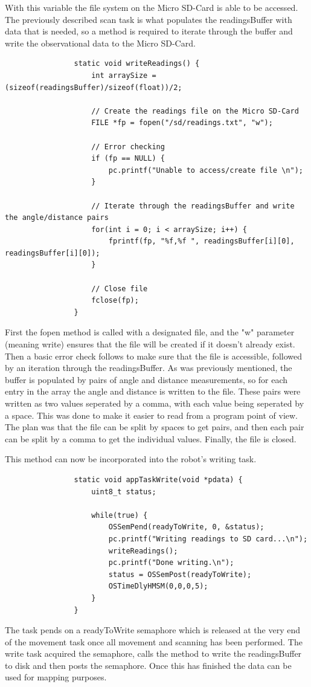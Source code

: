 				With this variable the file system on the Micro SD-Card is able to be accessed. The previously described scan task is what populates the readingsBuffer with data that is needed, so a method is required to iterate through the buffer and write the observational data to the Micro SD-Card.
				
				\begin{lstlisting}
				static void writeReadings() {
					int arraySize = (sizeof(readingsBuffer)/sizeof(float))/2;
				
					// Create the readings file on the Micro SD-Card
					FILE *fp = fopen("/sd/readings.txt", "w");
				
					// Error checking
					if (fp == NULL) {
						pc.printf("Unable to access/create file \n");
					}
				
					// Iterate through the readingsBuffer and write the angle/distance pairs
					for(int i = 0; i < arraySize; i++) {
						fprintf(fp, "%f,%f ", readingsBuffer[i][0], readingsBuffer[i][0]);
					}
				
					// Close file
					fclose(fp);
				}
				\end{lstlisting}
				First the fopen method is called with a designated file, and the "w" parameter (meaning write) ensures that the file will be created if it doesn't already exist. Then a basic error check follows to make sure that the file is accessible, followed by an iteration through the readingsBuffer. As was previously mentioned, the buffer is populated by pairs of angle and distance measurements, so for each entry in the array the angle and distance is written to the file. These pairs were written as two values seperated by a comma, with each value being seperated by a space. This was done to make it easier to read from a program point of view. The plan was that the file can be split by spaces to get pairs, and then each pair can be split by a comma to get the individual values. Finally, the file is closed.
				
				This method can now be incorporated into the robot's writing task.
				
				\begin{lstlisting}
				static void appTaskWrite(void *pdata) {
					uint8_t status;
				
					while(true) {
						OSSemPend(readyToWrite, 0, &status);
						pc.printf("Writing readings to SD card...\n");
						writeReadings();
						pc.printf("Done writing.\n");
						status = OSSemPost(readyToWrite);
						OSTimeDlyHMSM(0,0,0,5);
					}
				}
				\end{lstlisting}
				The task pends on a readyToWrite semaphore which is released at the very end of the movement task once all movement and scanning has been performed. The write task acquired the semaphore, calls the method to write the readingsBuffer to disk and then posts the semaphore. Once this has finished the data can be used for mapping purposes.
				
